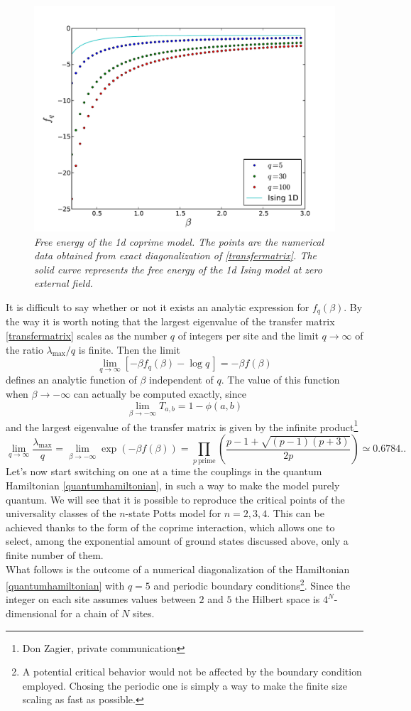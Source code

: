 \documentclass[aps,pra,superscriptaddress]{revtex4}
\newcommand\be            {\begin{equation}}
\newcommand\ee            {\end{equation}}
\renewcommand{\(}{\left(}
\renewcommand{\)}{\right)}
\renewcommand{\[}{\left[}
\renewcommand{\]}{\right]}
\begin{document}
\begin{figure}[H]
\center
\includegraphics[scale=0.5]{Figures/f1d.pdf}
\caption{{\em Free energy of the 1d coprime model. The points are the numerical data obtained from exact diagonalization of \eqref{transfermatrix}. The solid curve represents the free energy of the 1d Ising model at zero external field.}}
\label{f1d}
\end{figure}
It is difficult to say whether or not it exists an analytic expression for $f_q(\beta)$. By the way it is worth noting that the largest eigenvalue of the transfer matrix \eqref{transfermatrix} scales as the number $q$ of integers per site and the limit $q \to \infty$ of the ratio $\lambda_\mathrm{max}/q$ is finite. Then the limit
\be \label{fun}
\lim_{q \to \infty } \[ - \beta f_q(\beta) - \log q \, \] = - \beta f(\beta)
\ee
defines an analytic function of $\beta$ independent of $q$. The value of this function when $\beta \to -\infty$ can actually be computed exactly, since
\be 
\lim_{\beta \to -\infty } T_{a,b}  = 1 - \phi(a,b) 
\ee
and the largest eigenvalue of the transfer matrix is given by the infinite product\footnote{Don Zagier, private communication}
\be 
\lim_{q \to \infty} \frac{ \lambda_\mathrm{max} }{ q } = \lim_{\beta \to -\infty} \exp \(-\beta f (\beta) \) = \prod_{p ~ \mathrm{prime} } \( \frac{ p-1 + \sqrt{(p-1)(p+3)} }{2 p}  \) \simeq 0.6784..
\ee
Let's now start switching on one at a time the couplings in the quantum Hamiltonian \eqref{quantumhamiltonian}, in such a way to make the model purely quantum. We will see that it is possible to reproduce the critical points of the universality classes of the $n$-state Potts model for $n=2,3,4$. This can be achieved thanks to the form of the coprime interaction, which allows one to select, among the exponential amount of ground states discussed above, only a finite number of them.\\ What follows is the outcome of a numerical diagonalization of the Hamiltonian \eqref{quantumhamiltonian} with $q=5$ and periodic boundary conditions\footnote{A potential critical behavior would not be affected by the boundary condition employed. Chosing the periodic one is simply a way to make the finite size scaling as fast as possible.}. Since the integer on each site assumes values between $2$ and $5$ the Hilbert space is $4^N$-dimensional for a chain of $N$ sites.
\end{document}
